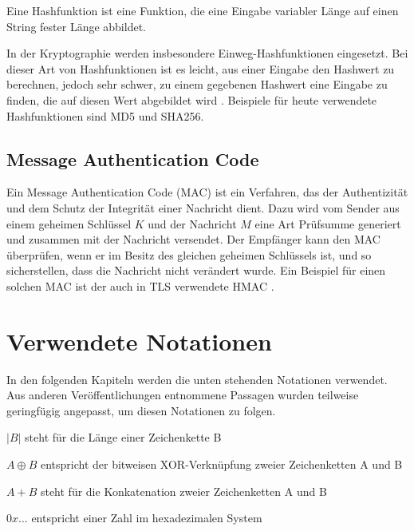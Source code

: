Eine Hashfunktion ist eine Funktion, die eine Eingabe variabler Länge auf einen String fester Länge abbildet.

In der Kryptographie werden insbesondere Einweg-Hashfunktionen eingesetzt. Bei dieser Art von Hashfunktionen ist es leicht, aus einer Eingabe den Hashwert zu berechnen, jedoch sehr schwer, zu einem gegebenen Hashwert eine Eingabe zu finden, die auf diesen Wert abgebildet wird \cite{Schneier2006}. Beispiele für heute verwendete Hashfunktionen sind MD5 und SHA256.

\subsection{Message Authentication Code}

\label{sec_mac}

Ein Message Authentication Code (MAC) ist ein Verfahren, das der Authentizität und dem Schutz der Integrität einer Nachricht dient. Dazu wird vom Sender aus einem geheimen Schlüssel \(K\) und der Nachricht \(M\) eine Art Prüfsumme generiert und zusammen mit der Nachricht versendet. Der Empfänger kann den MAC überprüfen, wenn er im Besitz des gleichen geheimen Schlüssels ist, und so sicherstellen, dass die Nachricht nicht verändert wurde. Ein Beispiel für einen solchen MAC ist der auch in TLS verwendete HMAC \cite{Schneier2006, ferguson10}.

\section{Verwendete Notationen}

In den folgenden Kapiteln werden die unten stehenden Notationen verwendet. Aus anderen Veröffentlichungen entnommene Passagen wurden teilweise geringfügig angepasst, um diesen Notationen zu folgen.

\(|B|\) steht für die Länge einer Zeichenkette B

\(A \oplus B\) entspricht der bitweisen XOR-Verknüpfung zweier Zeichenketten A und B

\(A + B\) steht für die Konkatenation zweier Zeichenketten A und B

\(0x\dots\) entspricht einer Zahl im hexadezimalen System

